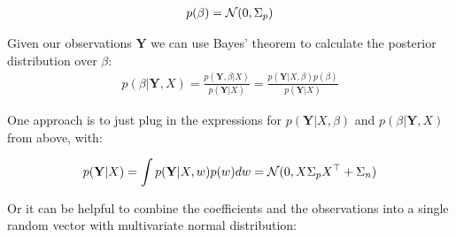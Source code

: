 \begin{gather*}
    p(\beta) = \operatorname{\mathcal{N}}(0, \Sigma_p)
\end{gather*}

Given our observations $\mathbf{Y}$  we can use Bayes' theorem to calculate the posterior distribution over $\beta$:
\begin{gather*}
    p(\beta| \mathbf{Y}, X) = \frac{p(\mathbf{Y},\beta|X)}{p(\mathbf{Y}|X)} =
    \frac{p(\mathbf{Y}|X,\beta)p(\beta)}{p(\mathbf{Y}|X)}
\end{gather*}

One approach is to just plug in the expressions for
$p(\mathbf{Y}|X,\beta)$ and $p(\beta|\mathbf{Y}, X)$ from above, with:

\begin{gather*}
    p(\mathbf{Y}|X) = \int p(\mathbf{Y}|X,w) p(w) dw = \operatorname{\mathcal{N}}(0, X \Sigma_p X^{\top} + \Sigma_n)
\end{gather*}

Or it can be helpful to combine the coefficients and the observations into a single random vector with
multivariate normal distribution:

